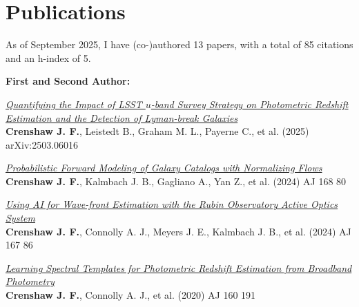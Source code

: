 \section{Publications}

As of September 2025, I have (co-)authored 13 papers, with a total of 85 citations and an h-index of 5. \vspace{2mm}

\textbf{First and Second Author:}
\begin{etaremune}
\item \href{https://ui.adsabs.harvard.edu/abs/2025arXiv250306016C}{\textit{Quantifying the Impact of LSST $u$-band Survey Strategy on Photometric Redshift Estimation and the Detection of Lyman-break Galaxies}} \\ 
\textbf{Crenshaw J. F.}, Leistedt B., Graham M. L., Payerne C., et al. (2025) 
arXiv:2503.06016 

\item \href{https://ui.adsabs.harvard.edu/abs/2024AJ....168...80C}{\textit{Probabilistic Forward Modeling of Galaxy Catalogs with Normalizing Flows}} \\ 
\textbf{Crenshaw J. F.}, Kalmbach J. B., Gagliano A., Yan Z., et al. (2024) 
AJ 168 80 

\item \href{https://ui.adsabs.harvard.edu/abs/2024AJ....167...86C}{\textit{Using AI for Wave-front Estimation with the Rubin Observatory Active Optics System}} \\ 
\textbf{Crenshaw J. F.}, Connolly A. J., Meyers J. E., Kalmbach J. B., et al. (2024) 
AJ 167 86 

\item \href{https://ui.adsabs.harvard.edu/abs/2020AJ....160..191C}{\textit{Learning Spectral Templates for Photometric Redshift Estimation from Broadband Photometry}} \\ 
\textbf{Crenshaw J. F.}, Connolly A. J., et al. (2020) 
AJ 160 191 

\end{etaremune}


